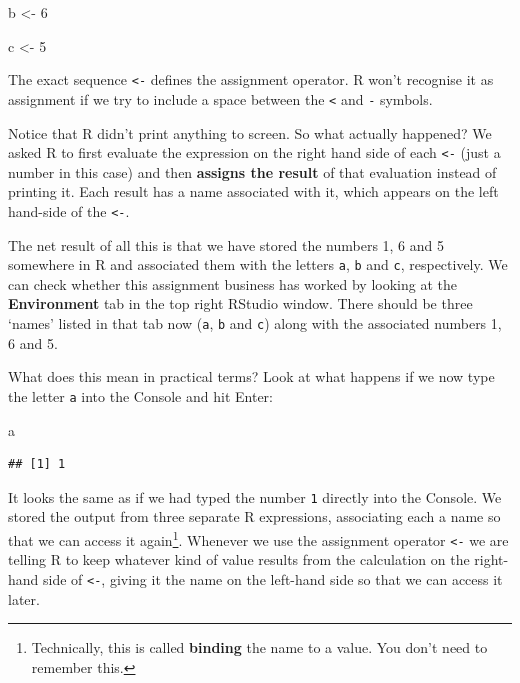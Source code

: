 \documentclass[
]{book}
\newenvironment{Shaded}{\begin{snugshade}}{\end{snugshade}}
\newcommand{\DecValTok}[1]{\textcolor[rgb]{0.00,0.00,0.81}{#1}}
\newcommand{\NormalTok}[1]{#1}
\newcommand{\OtherTok}[1]{\textcolor[rgb]{0.56,0.35,0.01}{#1}}
\begin{document}
\begin{Shaded}
\begin{Highlighting}[]
\NormalTok{b }\OtherTok{\textless{}{-}} \DecValTok{6}
\end{Highlighting}
\end{Shaded}

\begin{Shaded}
\begin{Highlighting}[]
\NormalTok{c }\OtherTok{\textless{}{-}} \DecValTok{5}
\end{Highlighting}
\end{Shaded}

The exact sequence \texttt{\textless{}-} defines the assignment operator. R won't recognise it as assignment if we try to include a space between the \texttt{\textless{}} and \texttt{-} symbols.

Notice that R didn't print anything to screen. So what actually happened? We asked R to first evaluate the expression on the right hand side of each \texttt{\textless{}-} (just a number in this case) and then \textbf{assigns the result} of that evaluation instead of printing it. Each result has a name associated with it, which appears on the left hand-side of the \texttt{\textless{}-}.

The net result of all this is that we have stored the numbers 1, 6 and 5 somewhere in R and associated them with the letters \texttt{a}, \texttt{b} and \texttt{c}, respectively. We can check whether this assignment business has worked by looking at the \textbf{Environment} tab in the top right RStudio window. There should be three `names' listed in that tab now (\texttt{a}, \texttt{b} and \texttt{c}) along with the associated numbers 1, 6 and 5.

What does this mean in practical terms? Look at what happens if we now type the letter \texttt{a} into the Console and hit Enter:

\begin{Shaded}
\begin{Highlighting}[]
\NormalTok{a}
\end{Highlighting}
\end{Shaded}

\begin{verbatim}
## [1] 1
\end{verbatim}

It looks the same as if we had typed the number \texttt{1} directly into the Console. We stored the output from three separate R expressions, associating each a name so that we can access it again\footnote{Technically, this is called \textbf{binding} the name to a value. You don't need to remember this.}. Whenever we use the assignment operator \texttt{\textless{}-} we are telling R to keep whatever kind of value results from the calculation on the right-hand side of \texttt{\textless{}-}, giving it the name on the left-hand side so that we can access it later.
\end{document}
